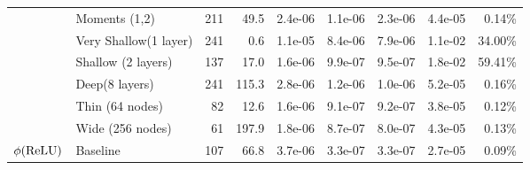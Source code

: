 \begin{tabular}{llrrrrrrr}
                         & Moments (1,2) &                      211 &                      49.5 &                                   2.4e-06 &                                  1.1e-06 &                                 2.3e-06 &                                            4.4e-05 &                                             0.14\% \\
                         & Very Shallow(1 layer) &                      241 &                       0.6 &                                   1.1e-05 &                                  8.4e-06 &                                 7.9e-06 &                                            1.1e-02 &                                            34.00\% \\
                         & Shallow (2 layers) &                      137 &                      17.0 &                                   1.6e-06 &                                  9.9e-07 &                                 9.5e-07 &                                            1.8e-02 &                                            59.41\% \\
                         & Deep(8 layers) &                      241 &                     115.3 &                                   2.8e-06 &                                  1.2e-06 &                                 1.0e-06 &                                            5.2e-05 &                                             0.16\% \\
                         & Thin (64 nodes) &                       82 &                      12.6 &                                   1.6e-06 &                                  9.1e-07 &                                 9.2e-07 &                                            3.8e-05 &                                             0.12\% \\
                         & Wide (256 nodes) &                       61 &                     197.9 &                                   1.8e-06 &                                  8.7e-07 &                                 8.0e-07 &                                            4.3e-05 &                                             0.13\% \\
\cline{1-9}
\multirow{12}{*}{$\phi(\textup{ReLU})$} & Baseline &                      107 &                      66.8 &                                   3.7e-06 &                                  3.3e-07 &                                 3.3e-07 &                                            2.7e-05 &                                             0.09\% \\

\end{tabular}
